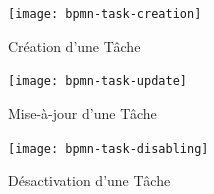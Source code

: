 \documentclass[french,12pt]{article}
\begin{document}
				\vspace*{\fill}
				\begin{figure}[h]
					\centering
					\texttt{[image: bpmn-task-creation]}
					\caption{Création d’une Tâche}
				\end{figure}
				\vspace*{\fill}

				\newpage
				\vspace*{\fill}
				\begin{figure}[h]
					\centering
					\texttt{[image: bpmn-task-update]}
					\caption{Mise-à-jour d’une Tâche}
				\end{figure}
				\vspace*{\fill}

				\newpage
				\vspace*{\fill}
				\begin{figure}[h]
					\centering
					\texttt{[image: bpmn-task-disabling]}
					\caption{Désactivation d’une Tâche}
				\end{figure}
				\vspace*{\fill}

\end{document}
